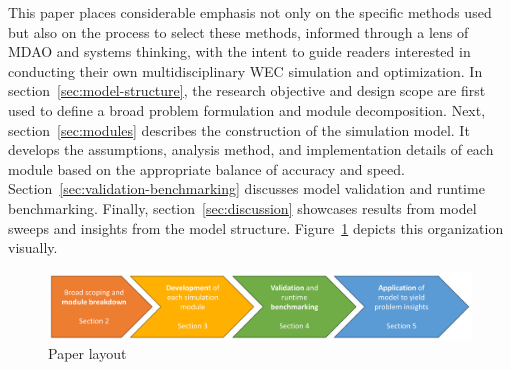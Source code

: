 This paper places considerable emphasis not only on the specific methods used but also on the process to select these methods, informed through a lens of MDAO and systems thinking, with the intent to guide readers interested in conducting their own multidisciplinary WEC simulation and optimization.
In section~\ref{sec:model-structure}, the research objective and design scope are first used to define a broad problem formulation and module decomposition.
Next, section~\ref{sec:modules} describes the construction of the simulation model.
It develops the assumptions, analysis method, and implementation details of each module based on the appropriate balance of accuracy and speed.
Section~\ref{sec:validation-benchmarking} discusses model validation and runtime benchmarking.
Finally, section~\ref{sec:discussion} showcases results from model sweeps and insights from the model structure.
Figure~\ref{fig:overview-methods} depicts this organization visually.
\begin{figure}
    \centering
    \includegraphics[width=1\linewidth]{figs/section_flow.pdf}
    \caption{Paper layout}
    \label{fig:overview-methods}
\end{figure}